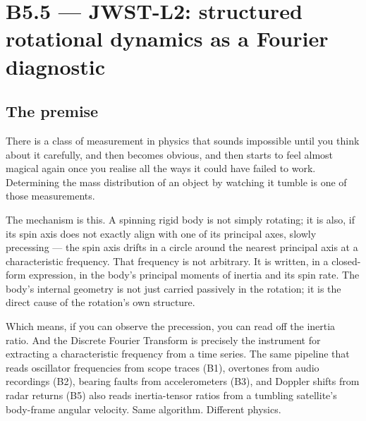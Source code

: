 \documentclass[11pt,a4paper,openany]{book}
\begin{document}
\renewcommand{\thechapter}{5.5}
\chapter{B5.5 --- JWST-L2: structured rotational dynamics as a Fourier diagnostic}
\label{ch:b55}


\section{The premise}

There is a class of measurement in physics that sounds impossible until you
think about it carefully, and then becomes obvious, and then starts to feel
almost magical again once you realise all the ways it could have failed to
work. Determining the mass distribution of an object by watching it tumble
is one of those measurements.

The mechanism is this. A spinning rigid body is not simply rotating; it is
also, if its spin axis does not exactly align with one of its principal axes,
slowly precessing --- the spin axis drifts in a circle around the nearest
principal axis at a characteristic frequency. That frequency is not arbitrary.
It is written, in a closed-form expression, in the body's principal moments
of inertia and its spin rate. The body's internal geometry is not just carried
passively in the rotation; it is the direct cause of the rotation's own
structure.

Which means, if you can observe the precession, you can read off the inertia
ratio. And the Discrete Fourier Transform is precisely the instrument for
extracting a characteristic frequency from a time series. The same pipeline
that reads oscillator frequencies from scope traces (B1), overtones from audio
recordings (B2), bearing faults from accelerometers (B3), and Doppler shifts
from radar returns (B5) also reads inertia-tensor ratios from a tumbling
satellite's body-frame angular velocity. Same algorithm. Different physics.
\end{document}

